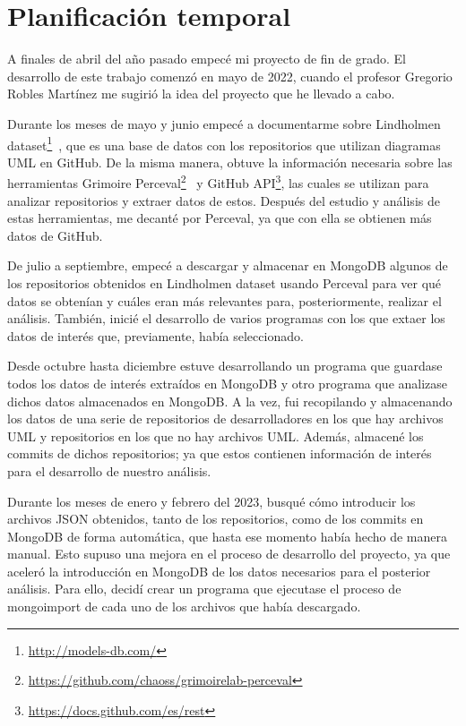 \documentclass[a4paper, 12pt]{book}
\begin{document}
\section{Planificación temporal}
\label{sec:planificacion-temporal}

A finales de abril del año pasado empecé mi proyecto de fin de grado. 
El desarrollo de este trabajo comenzó en mayo de 2022, cuando el profesor Gregorio Robles Martínez me sugirió la idea del proyecto que he llevado a cabo. 


Durante los meses de mayo y junio empecé a documentarme sobre Lindholmen dataset\footnote{\url{http://models-db.com/}}~\cite{robles2017extensive}, que es una base de datos con los repositorios que utilizan diagramas UML en GitHub.
De la misma manera, obtuve la información necesaria sobre las herramientas Grimoire Perceval\footnote{\url{https://github.com/chaoss/grimoirelab-perceval}}~\cite{duenas2018perceval} y GitHub API\footnote{\url{https://docs.github.com/es/rest}}, las cuales se utilizan para analizar repositorios y extraer datos de estos. 
Después del estudio y análisis de estas herramientas, me decanté por Perceval, ya que con ella se obtienen más datos de GitHub.


De julio a septiembre, empecé a descargar y almacenar en MongoDB algunos de los repositorios obtenidos en Lindholmen dataset usando Perceval para ver qué datos se obtenían y cuáles eran más relevantes para, posteriormente, realizar el análisis.
También, inicié el desarrollo de varios programas con los que extaer los datos de interés que, previamente, había seleccionado.


Desde octubre hasta diciembre estuve desarrollando un programa que guardase todos los datos de interés extraídos en MongoDB y otro programa que analizase dichos datos almacenados en MongoDB.
A la vez, fui recopilando y almacenando los datos de una serie de repositorios de desarrolladores en los que hay archivos UML y repositorios en los que no hay archivos UML.
Además, almacené los commits de dichos repositorios; ya que estos contienen información de interés para el desarrollo de nuestro análisis.


Durante los meses de enero y febrero del 2023, busqué cómo introducir los archivos JSON obtenidos, tanto de los repositorios, como de los commits en MongoDB de forma automática, que hasta ese momento había hecho de manera manual.
Esto supuso una mejora en el proceso de desarrollo del proyecto, ya que aceleró la introducción en MongoDB de los datos necesarios para el posterior análisis.
Para ello, decidí crear un programa que ejecutase el proceso de mongoimport de cada uno de los archivos que había descargado. 
\end{document}

